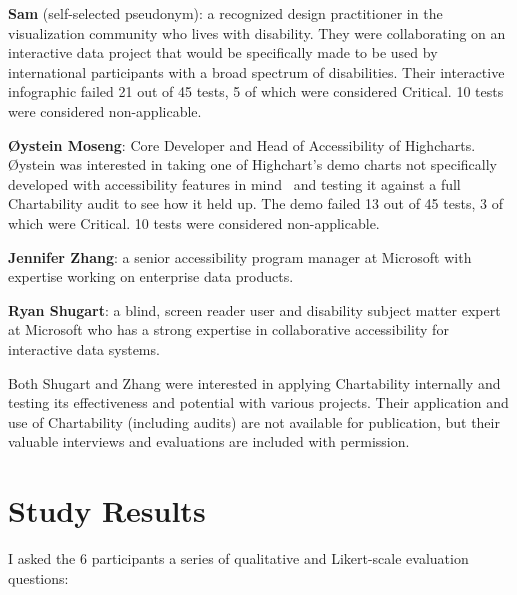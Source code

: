 \documentclass[12pt]{cmuthesis}
\begin{document}
\textbf{Sam} (self-selected pseudonym): a recognized design practitioner in the visualization community who lives with disability. They were collaborating on an interactive data project that would be specifically made to be used by international participants with a broad spectrum of disabilities. Their interactive infographic failed 21 out of 45 tests, 5 of which were considered Critical. 10 tests were considered non-applicable.

\textbf{Øystein Moseng}: Core Developer and Head of Accessibility of Highcharts. Øystein was interested in taking one of Highchart’s demo charts not specifically developed with accessibility features in mind~\cite{HighsoftHighcharts} and testing it against a full Chartability audit to see how it held up. The demo failed 13 out of 45 tests, 3 of which were Critical. 10 tests were considered non-applicable.

\textbf{Jennifer Zhang}: a senior accessibility program manager at Microsoft with expertise working on enterprise data products.

\textbf{Ryan Shugart}: a blind, screen reader user and disability subject matter expert at Microsoft who has a strong expertise in collaborative accessibility for interactive data systems. 

Both Shugart and Zhang were interested in applying Chartability internally and testing its effectiveness and potential with various projects. Their application and use of Chartability (including audits) are not available for publication, but their valuable interviews and evaluations are included with permission.


\section{Study Results}

I asked the 6 participants a series of qualitative and Likert-scale evaluation questions:
\end{document}
